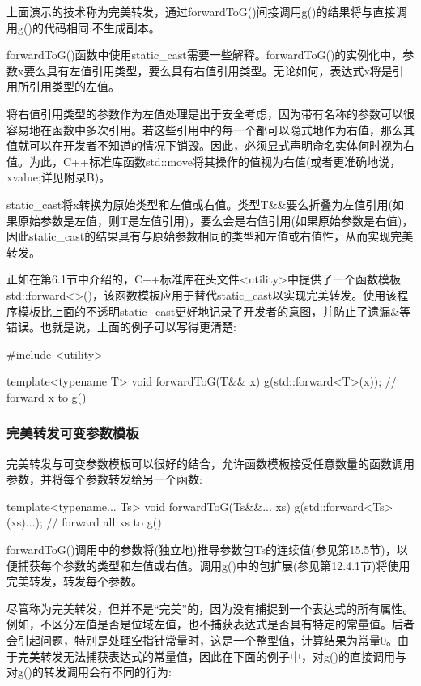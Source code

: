 上面演示的技术称为完美转发，通过forwardToG()间接调用g()的结果将与直接调用g()的代码相同:不生成副本。

forwardToG()函数中使用static\_cast需要一些解释。forwardToG()的实例化中，参数x要么具有左值引用类型，要么具有右值引用类型。无论如何，表达式x将是引用所引用类型的左值。

\begin{notice}将右值引用类型的参数作为左值处理是出于安全考虑，因为带有名称的参数可以很容易地在函数中多次引用。若这些引用中的每一个都可以隐式地作为右值，那么其值就可以在开发者不知道的情况下销毁。因此，必须显式声明命名实体何时视为右值。为此，C++标准库函数std::move将其操作的值视为右值(或者更准确地说，xvalue;详见附录B)。
\end{notice}

static\_cast将x转换为原始类型和左值或右值。类型T\&\&要么折叠为左值引用(如果原始参数是左值，则T是左值引用)，要么会是右值引用(如果原始参数是右值)，因此static\_cast的结果具有与原始参数相同的类型和左值或右值性，从而实现完美转发。

正如在第6.1节中介绍的，C++标准库在头文件<utility>中提供了一个函数模板std::forward<>()，该函数模板应用于替代static\_cast以实现完美转发。使用该程序模板比上面的不透明static\_cast更好地记录了开发者的意图，并防止了遗漏\&等错误。也就是说，上面的例子可以写得更清楚:

\begin{cpp}
#include <utility>

template<typename T> void forwardToG(T&& x)
{
	g(std::forward<T>(x)); // forward x to g()
}
\end{cpp}

\subsubsection{完美转发可变参数模板}

完美转发与可变参数模板可以很好的结合，允许函数模板接受任意数量的函数调用参数，并将每个参数转发给另一个函数:

\begin{cpp}
template<typename... Ts> void forwardToG(Ts&&... xs)
{
	g(std::forward<Ts>(xs)...); // forward all xs to g()
}
\end{cpp}

forwardToG()调用中的参数将(独立地)推导参数包Ts的连续值(参见第15.5节)，以便捕获每个参数的类型和左值或右值。调用g()中的包扩展(参见第12.4.1节)将使用完美转发，转发每个参数。

尽管称为完美转发，但并不是“完美”的，因为没有捕捉到一个表达式的所有属性。例如，不区分左值是否是位域左值，也不捕获表达式是否具有特定的常量值。后者会引起问题，特别是处理空指针常量时，这是一个整型值，计算结果为常量0。由于完美转发无法捕获表达式的常量值，因此在下面的例子中，对g()的直接调用与对g()的转发调用会有不同的行为:

